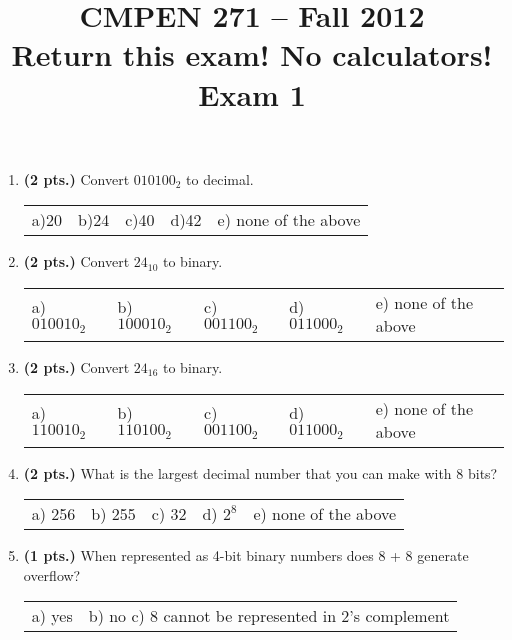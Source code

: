 \documentclass{article}
\begin{document}
\newcommand{\SOPmin}{${\rm SOP}_{\rm min} \ $}
\newcommand{\POSmin}{${\rm POS}_{\rm min} \ $}
\newcommand{\bs}{\backslash}


\title{
\Huge{CMPEN 271 -- Fall 2012}\\
\normalsize{Return this exam!  No calculators!}\\
\normalsize{Exam 1}\\
 }
\date{}

\maketitle{}


\begin{enumerate}

\item {\bf (2 pts.)} Convert $010100_2$ to decimal.

\begin{tabular}{p{0.7in} p{0.7in} p{0.7in} p{0.7in} l}
a)20 & b)24  & c)40  & d)42  & e) none of the above
\end{tabular}

\item {\bf (2 pts.)} Convert $24_{10}$ to binary.

\begin{tabular}{p{0.7in} p{0.7in} p{0.7in} p{0.7in} l}
a) $010010_2$ & b) $100010_2$ & c) $001100_2$ & d) $011000_2$ & e) none of the above
\end{tabular}

\item {\bf (2 pts.)} Convert $24_{16}$ to binary.

\begin{tabular}{p{0.7in} p{0.7in} p{0.7in} p{0.7in} l}
a) $110010_2$ & b) $110100_2$ & c) $001100_2$ & d) $011000_2$ & e) none of the above
\end{tabular}

\item {\bf (2 pts.)} What is the largest decimal number that you can make with 8 bits?

\begin{tabular}{p{0.7in} p{0.7in} p{0.7in} p{0.7in} l}
a) 256 & b) 255 & c) 32 & d) $2^{8}$ & e) none of the above
\end{tabular}

\item {\bf (1 pts.)} When represented as 4-bit binary numbers does 8 + 8 
generate overflow?

\begin{tabular}{p{0.7in} l}
a) yes & b) no  c) 8 cannot be represented in 2's complement
\end{tabular}


\end{enumerate}
\end{document}
